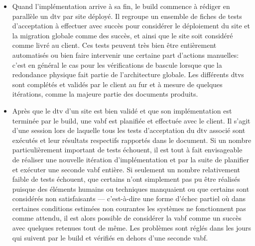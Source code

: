 \documentclass[12pt, oneside, a4paper, titlepage]{report}
\begin{document}
\begin{itemize}
    \item Quand l'implémentation arrive à sa fin, le \gls{build} commence à
        rédiger en parallèle un \gls{dtv} par site déployé. Il regroupe un
        ensemble de fiches de tests d'acceptation à effectuer avec succès pour
        considérer le déploiement du site et la migration globale comme des
        succès, et ainsi que le site soit considéré comme livré au client. Ces
        tests peuvent très bien être entièrement automatisés ou bien faire
        intervenir une certaine part d'actions manuelles: c'est en général le
        cas pour les vérifications de bascule lorsque que la redondance physique
        fait partie de l'architecture globale.  Les différents \glspl{dtv} sont
        complétés et validés par le client au fur et à mesure de quelques
        itérations, comme la majeure partie des documents produits.

    \item Après que le \gls{dtv} d'un site est bien validé et que son
        implémentation est terminée par le \gls{build}, une \gls{vabf} est
        planifiée et effectuée avec le client. Il s'agit d'une session lors de
        laquelle tous les tests d'acceptation du \gls{dtv} associé sont exécutés
        et leur résultats respectifs rapportés dans le document. Si un nombre
        particulièrement important de tests échouent, il est tout à fait
        envisageable de réaliser une nouvelle itération d'implémentation et par
        la suite de planifier et exécuter une seconde \gls{vabf} entière. Si
        seulement un nombre relativement faible de tests échouent, que certains
        n'ont simplement pas pu être réalisés puisque des éléments humains ou
        techniques manquaient ou que certains sont considérés non satisfaisants
        --- c'est-à-dire une forme d'échec partiel où dans certaines conditions
        estimées non courantes les systèmes ne fonctionnent pas comme attendu,
        il est alors possible de considérer la \gls{vabf} comme un succès avec
        quelques retenues tout de même. Les problèmes sont réglés dans les jours
        qui suivent par le \gls{build} et vérifiés en dehors d'une seconde
        \gls{vabf}.


\end{itemize}
\end{document}

